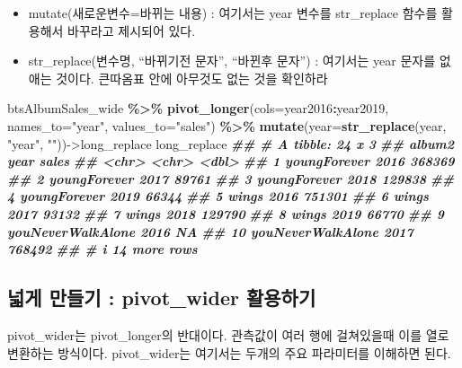 \documentclass[
]{book}
\newenvironment{Shaded}{\begin{snugshade}}{\end{snugshade}}
\newcommand{\AttributeTok}[1]{\textcolor[rgb]{0.13,0.29,0.53}{#1}}
\newcommand{\DocumentationTok}[1]{\textcolor[rgb]{0.56,0.35,0.01}{\textbf{\textit{#1}}}}
\newcommand{\FunctionTok}[1]{\textcolor[rgb]{0.13,0.29,0.53}{\textbf{#1}}}
\newcommand{\NormalTok}[1]{#1}
\newcommand{\OtherTok}[1]{\textcolor[rgb]{0.56,0.35,0.01}{#1}}
\newcommand{\SpecialCharTok}[1]{\textcolor[rgb]{0.81,0.36,0.00}{\textbf{#1}}}
\newcommand{\StringTok}[1]{\textcolor[rgb]{0.31,0.60,0.02}{#1}}
\providecommand{\tightlist}{%
  \setlength{\itemsep}{0pt}\setlength{\parskip}{0pt}}
\begin{document}
\begin{itemize}
\tightlist
\item
  mutate(새로운변수=바뀌는 내용) : 여기서는 year 변수를 str\_replace 함수를 활용해서 바꾸라고 제시되어 있다.
\item
  str\_replace(변수명, ``바뀌기전 문자'', ``바뀐후 문자'') : 여기서는 year 문자를 없애는 것이다. 큰따옴표 안에 아무것도 없는 것을 확인하라
\end{itemize}

\begin{Shaded}
\begin{Highlighting}[]
\NormalTok{btsAlbumSales\_wide }\SpecialCharTok{\%\textgreater{}\%} 
  \FunctionTok{pivot\_longer}\NormalTok{(}\AttributeTok{cols=}\NormalTok{year2016}\SpecialCharTok{:}\NormalTok{year2019, }\AttributeTok{names\_to=}\StringTok{"year"}\NormalTok{, }\AttributeTok{values\_to=}\StringTok{"sales"}\NormalTok{) }\SpecialCharTok{\%\textgreater{}\%} 
  \FunctionTok{mutate}\NormalTok{(}\AttributeTok{year=}\FunctionTok{str\_replace}\NormalTok{(year, }\StringTok{"year"}\NormalTok{, }\StringTok{""}\NormalTok{))}\OtherTok{{-}\textgreater{}}\NormalTok{long\_replace}
\NormalTok{long\_replace}
\DocumentationTok{\#\# \# A tibble: 24 x 3}
\DocumentationTok{\#\#    album2            year   sales}
\DocumentationTok{\#\#    \textless{}chr\textgreater{}             \textless{}chr\textgreater{}  \textless{}dbl\textgreater{}}
\DocumentationTok{\#\#  1 youngForever      2016  368369}
\DocumentationTok{\#\#  2 youngForever      2017   89761}
\DocumentationTok{\#\#  3 youngForever      2018  129838}
\DocumentationTok{\#\#  4 youngForever      2019   66344}
\DocumentationTok{\#\#  5 wings             2016  751301}
\DocumentationTok{\#\#  6 wings             2017   93132}
\DocumentationTok{\#\#  7 wings             2018  129790}
\DocumentationTok{\#\#  8 wings             2019   66770}
\DocumentationTok{\#\#  9 youNeverWalkAlone 2016      NA}
\DocumentationTok{\#\# 10 youNeverWalkAlone 2017  768492}
\DocumentationTok{\#\# \# i 14 more rows}
\end{Highlighting}
\end{Shaded}

\subsection{넓게 만들기 : pivot\_wider 활용하기}\label{uxb113uxac8c-uxb9ccuxb4e4uxae30-pivot_wider-uxd65cuxc6a9uxd558uxae30}

pivot\_wider는 pivot\_longer의 반대이다. 관측값이 여러 행에 걸쳐있을때 이를 열로 변환하는 방식이다. pivot\_wider는 여기서는 두개의 주요 파라미터를 이해하면 된다.
\end{document}
